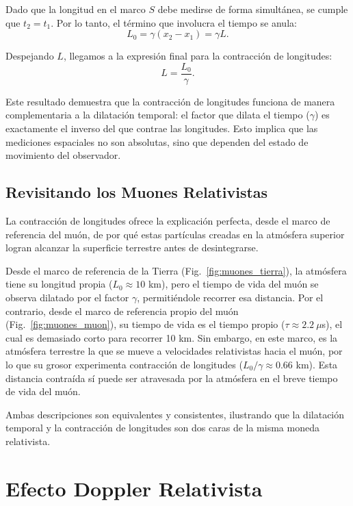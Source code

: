 Dado que la longitud en el marco $S$ debe medirse de forma simultánea, se cumple que $t_2 = t_1$. Por lo tanto, el término que involucra el tiempo se anula:
$$
L_0 = \gamma(x_2 - x_1) = \gamma L.
$$

Despejando $L$, llegamos a la expresión final para la contracción de longitudes:
$$
L = \frac{L_0}{\gamma}.
$$

Este resultado demuestra que la contracción de longitudes funciona de manera complementaria a la dilatación temporal: el factor que dilata el tiempo ($\gamma$) es exactamente el inverso del que contrae las longitudes. Esto implica que las mediciones espaciales no son absolutas, sino que dependen del estado de movimiento del observador.

\subsection{Revisitando los Muones Relativistas}

La contracción de longitudes ofrece la explicación perfecta, desde el marco de referencia del muón, de por qué estas partículas creadas en la atmósfera superior logran alcanzar la superficie terrestre antes de desintegrarse. 

Desde el marco de referencia de la Tierra (Fig.~\ref{fig:muones_tierra}), la atmósfera tiene su longitud propia ($L_0 \approx 10$ km), pero el tiempo de vida del muón se observa dilatado por el factor $\gamma$, permitiéndole recorrer esa distancia. Por el contrario, desde el marco de referencia propio del muón (Fig.~\ref{fig:muones_muon}), su tiempo de vida es el tiempo propio ($\tau \approx 2.2\ \mu$s), el cual es demasiado corto para recorrer 10 km. Sin embargo, en este marco, es la atmósfera terrestre la que se mueve a velocidades relativistas hacia el muón, por lo que su grosor experimenta contracción de longitudes ($L_0/\gamma \approx 0.66$ km). Esta distancia contraída sí puede ser atravesada por la atmósfera en el breve tiempo de vida del muón.





Ambas descripciones son equivalentes y consistentes, ilustrando que la dilatación temporal y la contracción de longitudes son dos caras de la misma moneda relativista.

\section{Efecto Doppler Relativista}

